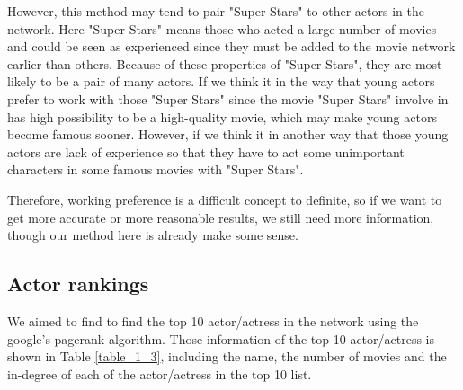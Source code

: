 \documentclass[11pt]{article}
\begin{document}
However, this method may tend to pair "Super Stars" to other actors in the network. Here "Super Stars" means those who acted a large number of movies and could be seen as experienced since they must be added to the movie network earlier than others. Because of these properties of "Super Stars", they are most likely to be a pair of many actors. If we think it in the way that young actors prefer to work with those "Super Stars" since the movie "Super Stars" involve in has high possibility to be a high-quality movie, which may make young actors become famous sooner. However, if we think it in another way that those young actors are lack of experience so that they have to act some unimportant characters in some famous movies with "Super Stars".

Therefore, working preference is a difficult concept to definite, so if we want to get more accurate or more reasonable results, we still need more information, though our method here is already make some sense.

\subsection{Actor rankings}
We aimed to find to find the top 10 actor/actress in the network using the google’s pagerank algorithm. Those information of the top 10 actor/actress is shown in Table \ref{table_1_3}, including the name, the number of movies and the in-degree of each of the actor/actress in the top 10 list.

\begin{table}
\center
\caption{Top 10 highest pagerank score actor/actress}
\label{table_1_3}
\end{table}
\end{document}
